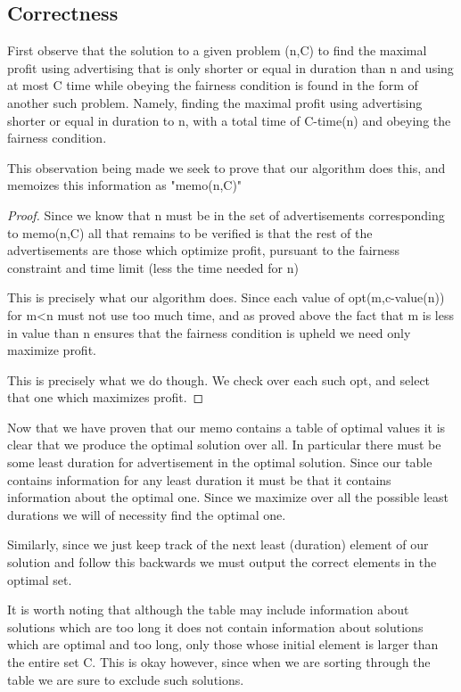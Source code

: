 \documentclass{article}
\begin{document}
\subsection{Correctness}
First observe that the solution to a given problem (n,C) to find the maximal profit using advertising that is only shorter or equal in duration than n and using at most C time while obeying the fairness condition is found in the form of another such problem. Namely, finding the maximal profit using advertising shorter or equal in duration to n, with a total time of C-time(n) and obeying the fairness condition.

This observation being made we seek to prove that our algorithm does this, and memoizes this information as "memo(n,C)"

\begin{proof}
Since we know that n must be in the set of advertisements corresponding to memo(n,C) all that remains to be verified is that the rest of the advertisements are those which optimize profit, pursuant to the fairness constraint and time limit (less the time needed for n)

This is precisely what our algorithm does. Since each value of opt(m,c-value(n)) for m<n must not use too much time, and as proved above the fact that m is less in value than n ensures that the fairness condition is upheld we need only maximize profit.

This is precisely what we do though. We check over each such opt, and select that one which maximizes profit.

\end{proof}

Now that we have proven that our memo contains a table of optimal values it is clear that we produce the optimal solution over all.  In particular there must be some least duration for advertisement in the optimal solution. Since our table contains information for any least duration it must be that it contains information about the optimal one. Since we maximize over all the possible least durations we will of necessity find the optimal one.

Similarly, since we just keep track of the next least (duration) element of our solution and follow this backwards we must output the correct elements in the optimal set.

It is worth noting that although the table may include information about solutions which are too long it does not contain information about solutions which are optimal and too long, only those whose initial element is larger than the entire set C. This is okay however, since when we are sorting through the table we are sure to exclude such solutions.
\end{document}

